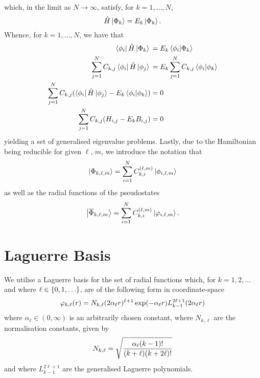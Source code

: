 \documentclass[]{article}
\begin{document}
which, in the limit as $N \to \infty$, satisfy, for $k = 1, \dotsc, N$,
\begin{equation*}
  \hat{H}
  \ket{\Phi_{k}}
  =
  E_{k}
  \ket{\Phi_{k}}
  .
\end{equation*}
Whence, for $k = 1, \dotsc, N$, we have that
\begin{alignat*}{2}
  \bra{\phi_{i}}
  \hat{H}
  \ket{\Phi_{k}}
  {}={}
  &
  E_{k}
  \bra{\phi_{i}}
  \ket{\Phi_{k}}
  \\
  \sum_{j = 1}^{N}
  C_{k, j}
  \bra{\phi_{i}}
  \hat{H}
  \ket{\phi_{j}}
  {}={}
  &
  E_{k}
  \sum_{j = 1}^{N}
  C_{k, j}
  \bra{\phi_{i}}
  \ket{\phi_{k}}
  \\
  \sum_{j = 1}^{N}
  C_{k, j}
  (
    \bra{\phi_{i}}
    \hat{H}
    \ket{\phi_{j}}
    -
    E_{k}
    \bra{\phi_{i}}
    \ket{\phi_{k}}
  )
  {}={}
  &
  0
  \\
  \sum_{j = 1}^{N}
  C_{k, j}
  (
    H_{i, j}
    -
    E_{k}
    B_{i, j}
  )
  {}={}
  &
  0
\end{alignat*}
yielding a set of generalised eigenvalue problems.
Lastly, due to the Hamiltonian being reducible for given $\ell$, $m$, we
introduce the notation that
\begin{equation*}
  \ket{\Phi_{k, \ell, m}}
  =
  \sum_{i = 1}^{N}
  C_{k, i}^{(\ell, m)}
  \ket{\phi_{i, \ell, m}}
\end{equation*}
as well as the radial functions of the pseudostates
\begin{equation*}
  \ket{\overline{\Phi}_{k, \ell, m}}
  =
  \sum_{i = 1}^{N}
  C_{k, i}^{(\ell, m)}
  \ket{\varphi_{i, \ell, m}}
  .
\end{equation*}

\clearpage
\section{Laguerre Basis}
\label{sec:laguerre-basis}

We utilise a Laguerre basis for the set of radial functions which,
for $k = 1, 2, \dotsc$ and where $\ell \in \lrset{0, 1, \dotsc}$, are of the
following form in coordinate-space
\begin{equation*}
  \varphi_{k, \ell}\lr{r}
  =
  N_{k, \ell}
  \lr
  {
    2
    \alpha_{\ell}
    r
  }^{\ell + 1}
  \exponential\lr
  {
    -
    \alpha_{\ell}
    r
  }
  L_{k - 1}^{2 \ell + 1}\lr{2 \alpha_{\ell} r}
\end{equation*}
where $\alpha_{\ell} \in (0, \infty)$ is an arbitrarily chosen constant,
where $N_{k, \ell}$ are the normalisation constants, given by
\begin{equation*}
  N_{k, \ell}
  =
  \sqrt
  {
    \dfrac
    {
      \alpha_{\ell}
      (k - 1)!
    }
    {
      (k + \ell)
      (k + 2 \ell)!
    }
  }
\end{equation*}
and where $L_{k - 1}^{2 \ell + 1}$ are the generalised Laguerre polynomials.
\end{document}
